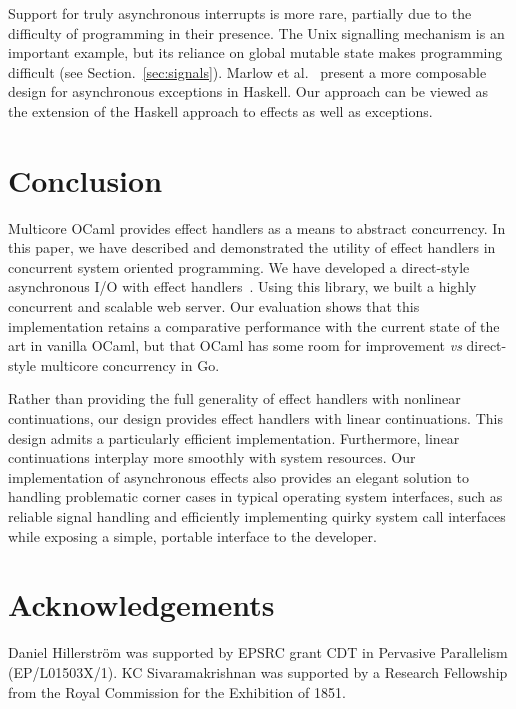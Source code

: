 \documentclass{llncs}
\begin{document}
Support for truly asynchronous interrupts is more rare, partially due to the
difficulty of programming in their presence. The Unix signalling mechanism is
an important example, but its reliance on global mutable state makes
programming difficult (see Section.~\ref{sec:signals}). Marlow et
al.~\citep*{Marlow2001async} present a more composable design for asynchronous
exceptions in Haskell. Our approach
can be viewed as the extension of the Haskell approach to effects as well as
exceptions.


\section{Conclusion}
\label{sec:conclusions}

Multicore OCaml provides effect handlers as a means to abstract concurrency. In
this paper, we have described and demonstrated the utility of effect handlers
in concurrent system oriented programming. We have developed a direct-style
asynchronous I/O with effect handlers~\citep*{aeio}. Using this library, we
built a highly concurrent and scalable web server. Our evaluation shows that
this implementation retains a comparative performance with the current state of
the art in vanilla OCaml, but that OCaml has some room for improvement {\em vs}
direct-style multicore concurrency in Go.

Rather than providing the full generality of effect handlers with nonlinear
continuations, our design provides effect handlers with linear continuations.
This design admits a particularly efficient implementation. Furthermore, linear
continuations interplay more smoothly with system resources. Our implementation
of asynchronous effects also provides an elegant solution to handling
problematic corner cases in typical operating system interfaces, such as
reliable signal handling and efficiently implementing quirky system call
interfaces while exposing a simple, portable interface to the developer.

\section*{Acknowledgements}
Daniel Hillerström was supported by EPSRC grant CDT in Pervasive
Parallelism (EP/L01503X/1).  KC Sivaramakrishnan was supported by a
Research Fellowship from the Royal Commission for the Exhibition of
1851.


\end{document}
